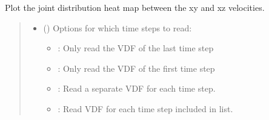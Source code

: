 \documentclass[letterpaper,10pt,english,openany,oneside]{sphinxmanual}
\begin{document}
\begin{fulllineitems}
\begin{fulllineitems}
\label{\detokenize{api/pytb.ThunderBoltz.plot_vdfs:pytb.ThunderBoltz.plot_vdfs}}
\pysigstartsignatures
{}
\pysigstopsignatures
\sphinxAtStartPar
Plot the joint distribution heat map between the x\sphinxhyphen{}y and x\sphinxhyphen{}z
velocities.
\begin{quote}\begin{description}
\begin{itemize}
\item {} 
\sphinxAtStartPar
{} (\sphinxstyleliteralemphasis{\sphinxupquote{, }}\sphinxstyleliteralemphasis{\sphinxupquote{{[}}}\sphinxstyleliteralemphasis{\sphinxupquote{{]}}}) \textendash{} 
\sphinxAtStartPar
Options for which time steps to
read:
\begin{itemize}
\item {} 
\sphinxAtStartPar
{}: Only read the VDF of the last time step

\item {} 
\sphinxAtStartPar
{}: Only read the VDF of the first time step

\item {} 
\sphinxAtStartPar
{}: Read a separate VDF for each time step.

\item {} 
\sphinxAtStartPar
{}: Read VDF for each time step included in list.


\end{itemize}
\end{itemize}
\end{description}
\end{quote}
\end{fulllineitems}
\end{fulllineitems}
\end{document}
